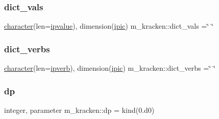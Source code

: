 \mbox{\label{namespacem__kracken_a1b8cabc9e407b8d9496f6fdb5c8da911}} 
\subsubsection{\texorpdfstring{dict\+\_\+vals}{dict\_vals}}
{\footnotesize\ttfamily \hyperlink{option__stopwatch_83_8txt_abd4b21fbbd175834027b5224bfe97e66}{character}(len=\hyperlink{namespacem__kracken_a9e71724677cede703e1fb186e446349f}{ipvalue}), dimension(\hyperlink{namespacem__kracken_a447be9e6b10e207b63049215d9274774}{ipic}) m\+\_\+kracken\+::dict\+\_\+vals =\char`\"{} \char`\"{}\hspace{0.3cm}{\ttfamily [private]}}

\mbox{\label{namespacem__kracken_a17809a6c9691598a268881418a993dfc}} 
\subsubsection{\texorpdfstring{dict\+\_\+verbs}{dict\_verbs}}
{\footnotesize\ttfamily \hyperlink{option__stopwatch_83_8txt_abd4b21fbbd175834027b5224bfe97e66}{character}(len=\hyperlink{namespacem__kracken_adda44fb0845c3cec44bc5a5bb258b395}{ipverb}), dimension(\hyperlink{namespacem__kracken_a447be9e6b10e207b63049215d9274774}{ipic}) m\+\_\+kracken\+::dict\+\_\+verbs =\char`\"{} \char`\"{}\hspace{0.3cm}{\ttfamily [private]}}

\mbox{\label{namespacem__kracken_a1de91e5ca55bf4fab118936bf4fad36a}} 
\subsubsection{\texorpdfstring{dp}{dp}}
{\footnotesize\ttfamily integer, parameter m\+\_\+kracken\+::dp = kind(0.d0)\hspace{0.3cm}{\ttfamily [private]}}

\mbox{\label{namespacem__kracken_a280e9cc13c1be9621bd79a970851f3fa}} 
